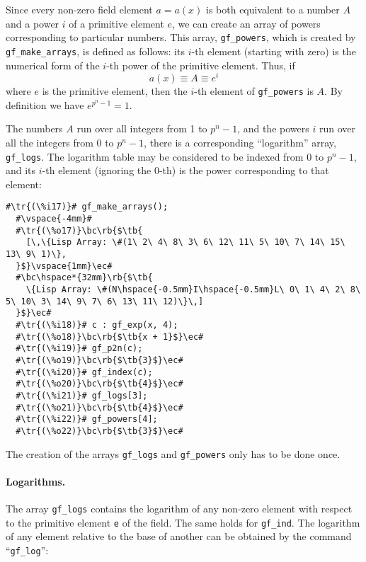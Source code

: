 \documentclass[a4paper,11pt,leqno,fleqn]{artikel3}
\newcommand{\bc}{\begin{center}}
\newcommand{\ec}{\end{center}}
\newcommand{\tr}[1]{\textcolor{red}{#1}}
\newcommand{\tb}[1]{\textcolor{blue}{#1}}
\newcommand{\rb}[1]{\raisebox{2mm}[0mm][1mm]{#1}}
\begin{document}
Since every non-zero field element $a=a(x)$ is both equivalent to a number $A$
and a power $i$ of a primitive element $e$, we can create an array of powers
corresponding to particular numbers.  This array, \texttt{gf\_powers},
which is created by \verb!gf_make_arrays!, 
is defined as follows: 
its $i$-th element (starting with zero) is the numerical form of the $i$-th power of the 
primitive element.  Thus, if
\[
a(x)\equiv A\equiv e^i
\]
where $e$ is the primitive element, then the $i$-th element of \texttt{gf\_powers} is
$A$.  By definition we have $e^{p^n-1}=1$.

The numbers $A$ run over all integers from 1 to $p^n-1$, and the powers $i$
run over all the integers from 0 to $p^n-1$, there is a corresponding
``logarithm'' array, \texttt{gf\_logs}.  
The logarithm table may be considered to be
indexed from 0 to $p^n-1$, and its $i$-th element (ignoring the 0-th) is the power 
corresponding to that element:

\vspace*{2mm}
\begin{lstlisting}[escapechar=\#]
  #\tr{(\%i17)}# gf_make_arrays();
  #\vspace{-4mm}#
  #\tr{(\%o17)}\bc\rb{$\tb{
    [\,\{Lisp Array: \#(1\ 2\ 4\ 8\ 3\ 6\ 12\ 11\ 5\ 10\ 7\ 14\ 15\ 13\ 9\ 1)\}, 
  }$}\vspace{1mm}\ec#
  #\bc\hspace*{32mm}\rb{$\tb{
    \{Lisp Array: \#(N\hspace{-0.5mm}I\hspace{-0.5mm}L\ 0\ 1\ 4\ 2\ 8\ 5\ 10\ 3\ 14\ 9\ 7\ 6\ 13\ 11\ 12)\}\,]
  }$}\ec#
  #\tr{(\%i18)}# c : gf_exp(x, 4);
  #\tr{(\%o18)}\bc\rb{$\tb{x + 1}$}\ec#
  #\tr{(\%i19)}# gf_p2n(c);
  #\tr{(\%o19)}\bc\rb{$\tb{3}$}\ec#
  #\tr{(\%i20)}# gf_index(c);
  #\tr{(\%o20)}\bc\rb{$\tb{4}$}\ec#
  #\tr{(\%i21)}# gf_logs[3];
  #\tr{(\%o21)}\bc\rb{$\tb{4}$}\ec#
  #\tr{(\%i22)}# gf_powers[4];
  #\tr{(\%o22)}\bc\rb{$\tb{3}$}\ec#
\end{lstlisting}

The creation of the arrays \texttt{gf\_logs} and \texttt{gf\_powers} 
only has to be done once.


\paragraph{Logarithms.}

The array \texttt{gf\_logs} contains the logarithm of any non-zero element 
with respect to the primitive element \texttt{e} of the field. 
The same holds for \texttt{gf\_ind}. The logarithm
of any element relative to the base of another can be obtained by the
command ``\verb!gf_log!'':
\end{document}
